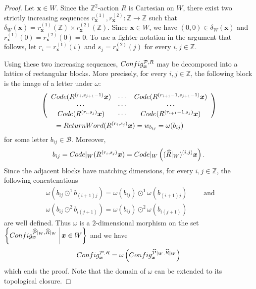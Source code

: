 \documentclass[12pt]{amsart}
\newcommand{\Z}{\mathbb{Z}}
\newcommand{\bx}{{\boldsymbol{x}}}
\newcommand{\Bcal}{\mathcal{B}}
\newcommand{\Pcal}{\mathcal{P}}
\newcommand{\scConfig}{\textsc{Config}}
\newcommand{\sccode}{\textsc{Code}}
\newcommand{\scReturnWord}{\textsc{ReturnWord}}
\begin{document}
\begin{proof}
    Let $\bx\in W$.
Since the $\Z^2$-action $R$ is Cartesian on $W$,
there exist two strictly increasing sequences $r_\bx^{(1)},r_\bx^{(2)}:\Z\to\Z$
such that $\delta_W(\bx)=r_\bx^{(1)}(\Z)\times r_\bx^{(2)}(\Z)$.
Since $\bx\in W$, we have $(0,0)\in\delta_W(\bx)$
and $r_\bx^{(1)}(0)=r_\bx^{(2)}(0)=0$.
To use a lighter notation in the argument that follows, let
$r_i=r_\bx^{(1)}(i)$
and
$s_j=r_\bx^{(2)}(j)$ for every $i,j\in\Z$.

    Using these two increasing sequences, $\scConfig^{\Pcal,R}_{\bx}$ may be decomposed into
    a lattice of rectangular blocks.
    More precisely, for every $i,j\in\Z$, the following block is the image of
    a letter under $\omega$:
    \begin{align*}
        &\left(\begin{array}{ccc}
            \sccode(R^{(r_i,s_{j+1}-1)}\bx) & \cdots 
                & \sccode(R^{(r_{i+1}-1,s_{j+1}-1)}\bx)\\
            \cdots & \cdots & \cdots\\
            \sccode(R^{(r_i,s_j)}\bx) & \cdots 
                & \sccode(R^{(r_{i+1}-1,s_j)}\bx)
        \end{array}\right)\\
        &\qquad= \scReturnWord(R^{(r_i,s_j)}\bx)
        =w_{b_{ij}}=\omega(b_{ij})
    \end{align*}
    for some letter $b_{ij}\in\Bcal$.
    Moreover,
    \[
        b_{ij}
        = \sccode|_W(R^{(r_i,s_j)}\bx)
        = \sccode|_W\left((\widehat{R}|_W)^{(i,j)}\bx\right).
    \]
    Since the adjacent blocks have matching dimensions, 
    for every $i,j\in\Z$, the following concatenations
    \begin{align*}
        & \omega\left(b_{ij}\odot^1 b_{(i+1)j}\right) = 
        \omega\left(b_{ij}\right)\odot^1 \omega\left(b_{(i+1)j}\right)
        \qquad\text{ and }
        \\
        & \omega\left(b_{ij}\odot^2 b_{i(j+1)}\right) = 
        \omega\left(b_{ij}\right)\odot^2 \omega\left(b_{i(j+1)}\right)
    \end{align*}
    are well defined. Thus $\omega$ is a $2$-dimensional morphism
    on the set
    $\left\{ \scConfig^{\widehat{\Pcal}|_W,\widehat{R}|_W}_{\bx}
            \,\middle|\, \bx\in W\right\}$
    and we have
    \[
        \scConfig^{\Pcal,R}_{\bx}
        =
        \omega\left(\scConfig^{\widehat{\Pcal}|_W,\widehat{R}|_W}_{\bx}\right)
    \]
    which ends the proof.
    Note that the domain of $\omega$ can be extended to
    its topological closure.
\end{proof}
\end{document}
